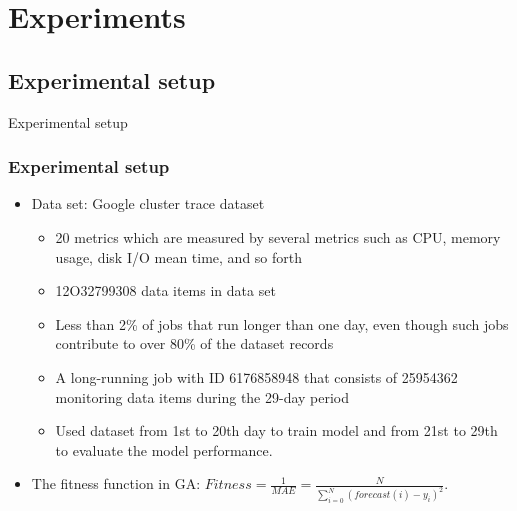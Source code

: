 \documentclass{beamer}
\begin{document}
\section{Experiments}
\subsection{Experimental setup}
\begin{frame}{Experimental setup}
	\frametitle{Experimental setup}
	\begin{itemize}
		\item {
			Data set: Google cluster trace dataset
			\begin{itemize}
			\item 20 metrics which are measured by several metrics such as CPU, memory usage, disk I/O mean time, and so forth
			\item 12O32799308 data items in data set
			\item  Less than 2\% of jobs that run longer than one day, even though such jobs contribute to over 80\% of the dataset records
			\item A long-running job with ID 6176858948 that consists of 25954362 monitoring data items during the 29-day period
			\item Used dataset from 1st to 20th day to train model and from 21st to 29th to evaluate the model performance.
			\end{itemize}
		}
		\item{
			The fitness function in GA: \newline
			$Fitness = \displaystyle \frac{1}{MAE} = \frac{N}{ \displaystyle \sum_{i=0}^N( forecast(i) - y_i)^2 }	\label{eq_fitness} $. 
			}
	\end{itemize}
\end{frame}
\end{document}
